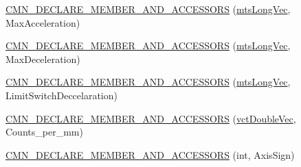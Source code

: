 {\bf }\par
\begin{DoxyCompactItemize}
\item 
\hyperlink{classprm_actuator_parameters_a84061877bd6e25f5d07f30a68f98bab5}{C\-M\-N\-\_\-\-D\-E\-C\-L\-A\-R\-E\-\_\-\-M\-E\-M\-B\-E\-R\-\_\-\-A\-N\-D\-\_\-\-A\-C\-C\-E\-S\-S\-O\-R\-S} (\hyperlink{mts_vector_8h_a3e011934ab1b5774f640a7bb70d9a672}{mts\-Long\-Vec}, Max\-Acceleration)
\end{DoxyCompactItemize}

{\bf }\par
\begin{DoxyCompactItemize}
\item 
\hyperlink{classprm_actuator_parameters_a5caffa85570f6eb8cff5035d0e1f8dc6}{C\-M\-N\-\_\-\-D\-E\-C\-L\-A\-R\-E\-\_\-\-M\-E\-M\-B\-E\-R\-\_\-\-A\-N\-D\-\_\-\-A\-C\-C\-E\-S\-S\-O\-R\-S} (\hyperlink{mts_vector_8h_a3e011934ab1b5774f640a7bb70d9a672}{mts\-Long\-Vec}, Max\-Deceleration)
\end{DoxyCompactItemize}

{\bf }\par
\begin{DoxyCompactItemize}
\item 
\hyperlink{classprm_actuator_parameters_a507bd11f4dd4e6b372d86427475758dc}{C\-M\-N\-\_\-\-D\-E\-C\-L\-A\-R\-E\-\_\-\-M\-E\-M\-B\-E\-R\-\_\-\-A\-N\-D\-\_\-\-A\-C\-C\-E\-S\-S\-O\-R\-S} (\hyperlink{mts_vector_8h_a3e011934ab1b5774f640a7bb70d9a672}{mts\-Long\-Vec}, Limit\-Switch\-Deccelaration)
\end{DoxyCompactItemize}

{\bf }\par
\begin{DoxyCompactItemize}
\item 
\hyperlink{classprm_actuator_parameters_a4f83620f433bad4daa1b94fe484a5323}{C\-M\-N\-\_\-\-D\-E\-C\-L\-A\-R\-E\-\_\-\-M\-E\-M\-B\-E\-R\-\_\-\-A\-N\-D\-\_\-\-A\-C\-C\-E\-S\-S\-O\-R\-S} (\hyperlink{vct_dynamic_vector_types_8h_ade4b3068c86fb88f41af2e5187e491c2}{vct\-Double\-Vec}, Counts\-\_\-per\-\_\-mm)
\end{DoxyCompactItemize}

{\bf }\par
\begin{DoxyCompactItemize}
\item 
\hyperlink{classprm_actuator_parameters_aa98f661afa1585c2342090247eaf9ca7}{C\-M\-N\-\_\-\-D\-E\-C\-L\-A\-R\-E\-\_\-\-M\-E\-M\-B\-E\-R\-\_\-\-A\-N\-D\-\_\-\-A\-C\-C\-E\-S\-S\-O\-R\-S} (int, Axis\-Sign)
\end{DoxyCompactItemize}

